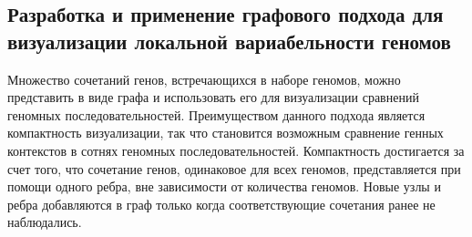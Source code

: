\begin{table}[htbp]
\centering
\caption{Список оперонов статистически значимо перепредставленных в группе штаммов \textit{E. coli} изолированных от пациентов с болезнью Крона. N - количество генов, Pobs - наблюдаемая доля перепредставленных генов в опероне, Pmean - средняя доля перепредставленных генов при случайных пермутациях, Pmax - максимальная доля перепредставленных генов при случайных пермутациях.}
\label{tbl:ops1}
\setlength{\fboxsep}{10pt}%
\setlength{\fboxrule}{0pt}%
\end{table}


\subsection*{Разработка и применение графового подхода для визуализации локальной вариабельности геномов}

Множество сочетаний генов, встречающихся в наборе геномов, можно представить в виде графа и использовать его для визуализации сравнений геномных последовательностей. Преимуществом данного подхода является компактность визуализации, так что становится возможным сравнение генных контекстов в сотнях геномных последовательностей. Компактность достигается за счет того, что сочетание генов, одинаковое для всех геномов, представляется при помощи одного ребра, вне зависимости от количества геномов. Новые узлы и ребра добавляются в граф только когда соответствующие сочетания ранее не наблюдались. 

